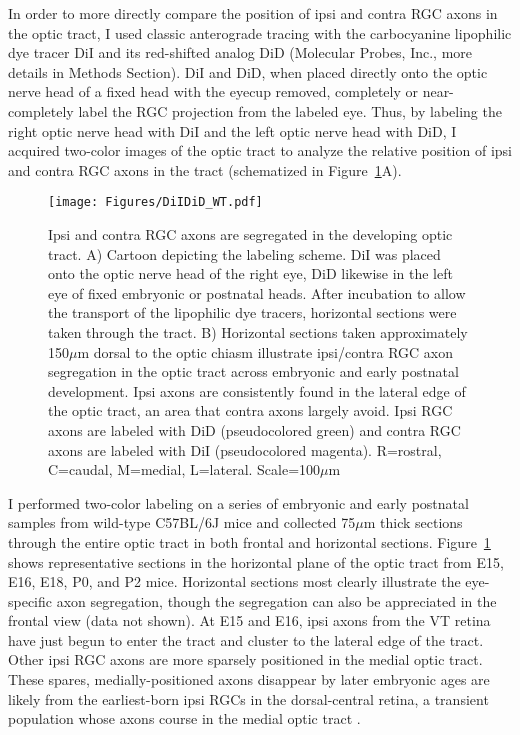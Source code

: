 In order to more directly compare the position of ipsi and contra RGC axons in the optic tract, I used classic anterograde tracing with the carbocyanine lipophilic dye tracer DiI and its red-shifted analog DiD (Molecular Probes, Inc., more details in Methods Section).
DiI and DiD, when placed directly onto the optic nerve head of a fixed head with the eyecup removed, completely or near-completely label the RGC projection from the labeled eye.
Thus, by labeling the right optic nerve head with DiI and the left optic nerve head with DiD, I acquired two-color images of the optic tract to analyze the relative position of ipsi and contra RGC axons in the tract (schematized in Figure~\ref{Figures/DiIDiDWT}A).

\begin{figure}[hbtp]
    \begin{center}
        \texttt{[image: Figures/DiIDiD\_WT.pdf]}
        \caption[Ipsi and contra RGC axons are segregated in the developing optic tract.]
        {Ipsi and contra RGC axons are segregated in the developing optic tract.
        A) Cartoon depicting the labeling scheme.
        DiI was placed onto the optic nerve head of the right eye, DiD likewise in the left eye of fixed embryonic or postnatal heads.
        After incubation to allow the transport of the lipophilic dye tracers, horizontal sections were taken through the tract.
        B) Horizontal sections taken approximately 150$\mu$m dorsal to the optic chiasm illustrate ipsi/contra RGC axon segregation in the optic tract across embryonic and early postnatal development.
        Ipsi axons are consistently found in the lateral edge of the optic tract, an area that contra axons largely avoid.
        Ipsi RGC axons are labeled with DiD (pseudocolored green) and contra RGC axons are labeled with DiI (pseudocolored magenta).
        R=rostral, C=caudal, M=medial, L=lateral. Scale=100$\mu$m}
        \label{Figures/DiIDiDWT}
    \end{center}
\end{figure}

I performed two-color labeling on a series of embryonic and early postnatal samples from wild-type C57BL/6J mice and collected 75$\mu$m thick sections through the entire optic tract in both frontal and horizontal sections.
Figure~\ref{Figures/DiIDiDWT} shows representative sections in the horizontal plane of the optic tract from E15, E16, E18, P0, and P2 mice.
Horizontal sections most clearly illustrate the eye-specific axon segregation, though the segregation can also be appreciated in the frontal view (data not shown). %
At E15 and E16, ipsi axons from the VT retina have just begun to enter the tract and cluster to the lateral edge of the tract.
Other ipsi RGC axons are more sparsely positioned in the medial optic tract.
These spares, medially-positioned axons disappear by later embryonic ages are likely from the earliest-born ipsi RGCs in the dorsal-central retina, a transient population \cite{drager1985birth} whose axons course in the medial optic tract \cite{soares2015transient}.

